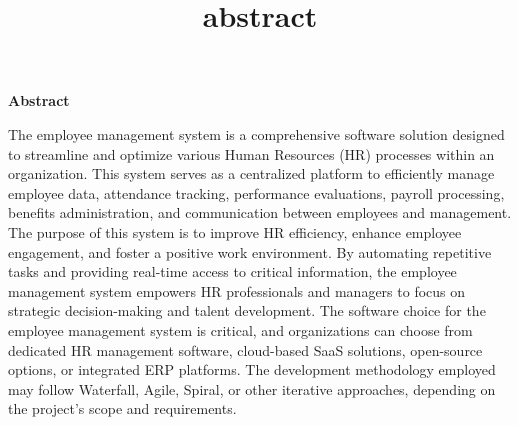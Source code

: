 \title{abstract}
\begin{center}
    \large \textbf{Abstract}
\end{center}
\vspace{5.5mm}
The employee management system is a comprehensive software solution designed to streamline and optimize various Human Resources (HR) processes within an organization. This system serves as a centralized platform to efficiently manage employee data, attendance tracking, performance evaluations, payroll processing, benefits administration, and communication between employees and management. The purpose of this system is to improve HR efficiency, enhance employee engagement, and foster a positive work environment. By automating repetitive tasks and providing real-time access to critical information, the employee management system empowers HR professionals and managers to focus on strategic decision-making and talent development. The software choice for the employee management system is critical, and organizations can choose from dedicated HR management software, cloud-based SaaS solutions, open-source options, or integrated ERP platforms. The development methodology employed may follow Waterfall, Agile, Spiral, or other iterative approaches, depending on the project's scope and requirements.